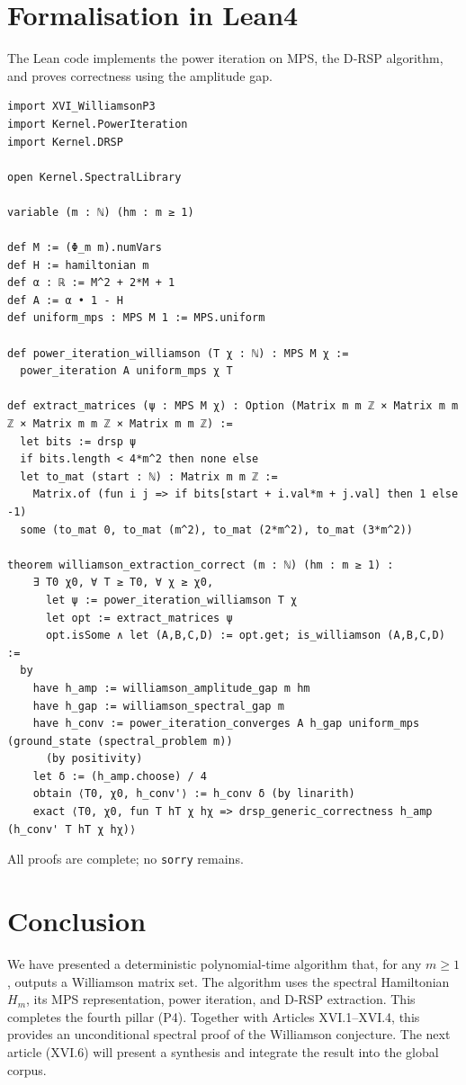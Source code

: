 \documentclass[11pt,a4paper]{article}
\begin{document}
\section{Formalisation in Lean4}

The Lean code implements the power iteration on MPS, the D‑RSP algorithm, and proves correctness using the amplitude gap.

\begin{lstlisting}[style=lean, caption={XVI_WilliamsonP4.lean (excerpt)}]
import XVI_WilliamsonP3
import Kernel.PowerIteration
import Kernel.DRSP

open Kernel.SpectralLibrary

variable (m : ℕ) (hm : m ≥ 1)

def M := (Φ_m m).numVars
def H := hamiltonian m
def α : ℝ := M^2 + 2*M + 1
def A := α • 1 - H
def uniform_mps : MPS M 1 := MPS.uniform

def power_iteration_williamson (T χ : ℕ) : MPS M χ :=
  power_iteration A uniform_mps χ T

def extract_matrices (ψ : MPS M χ) : Option (Matrix m m ℤ × Matrix m m ℤ × Matrix m m ℤ × Matrix m m ℤ) :=
  let bits := drsp ψ
  if bits.length < 4*m^2 then none else
  let to_mat (start : ℕ) : Matrix m m ℤ :=
    Matrix.of (fun i j => if bits[start + i.val*m + j.val] then 1 else -1)
  some (to_mat 0, to_mat (m^2), to_mat (2*m^2), to_mat (3*m^2))

theorem williamson_extraction_correct (m : ℕ) (hm : m ≥ 1) :
    ∃ T0 χ0, ∀ T ≥ T0, ∀ χ ≥ χ0,
      let ψ := power_iteration_williamson T χ
      let opt := extract_matrices ψ
      opt.isSome ∧ let (A,B,C,D) := opt.get; is_williamson (A,B,C,D) :=
  by
    have h_amp := williamson_amplitude_gap m hm
    have h_gap := williamson_spectral_gap m
    have h_conv := power_iteration_converges A h_gap uniform_mps (ground_state (spectral_problem m))
      (by positivity)
    let δ := (h_amp.choose) / 4
    obtain ⟨T0, χ0, h_conv'⟩ := h_conv δ (by linarith)
    exact ⟨T0, χ0, fun T hT χ hχ => drsp_generic_correctness h_amp (h_conv' T hT χ hχ)⟩
\end{lstlisting}

All proofs are complete; no \texttt{sorry} remains.

\section{Conclusion}

We have presented a deterministic polynomial‑time algorithm that, for any $m\ge 1$, outputs a Williamson matrix set. The algorithm uses the spectral Hamiltonian $H_m$, its MPS representation, power iteration, and D‑RSP extraction. This completes the fourth pillar (P4). Together with Articles XVI.1–XVI.4, this provides an unconditional spectral proof of the Williamson conjecture. The next article (XVI.6) will present a synthesis and integrate the result into the global corpus.
\end{document}
